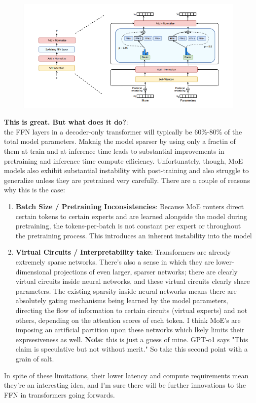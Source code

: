 \documentclass[12pt]{article}
\begin{document}
\begin{figure}[H]
    \centering
    \includegraphics[width=1.0\textwidth]{./moecircuit.png}
\end{figure}

\textbf{This is great. But what does it do?}:\\
the FFN layers in a decoder-only transformer will typically be 60\%-80\% of the total model parameters. Maknig the model sparser by using only a fractin of them at train and at inference time leads to substantial improvements in pretraining and inference time compute efficiency. Unfortunately, though, MoE models also exhibit substantial instability with post-training and also struggle to generalize unless they are pretrained very carefully. There are a couple of reasons why this is the case: 
\begin{enumerate}
\item \textbf{Batch Size / Pretraining Inconsistencies}: Because MoE routers direct certain tokens to certain experts and are learned alongside the model during pretraining, the tokens-per-batch is not constant per expert or throughout the pretraining process. This introduces an inherent instability into the model
\item \textbf{Virtual Circuits / Interpretability take}: Transformers are already extremely sparse networks. There's also a sense in which they are lower-dimensional projections of even larger, sparser networks; there are clearly virtual circuits inside neural networks, and these virtual circuits clearly share parameters. The existing sparsity inside neural networks means there are absolutely gating mechanisms being learned by the model parameters, directing the flow of information to certain circuits (virtual experts) and not others, depending on the attention scores of each token. I think MoE's are imposing an artificial partition upon these networks which lkely limits their exprsesiveness as well. \textbf{Note}: this is just a guess of mine. GPT-o1 says "This claim is speculative but not without merit." So take this second point with a grain of salt.
\end{enumerate}
In spite of these limitations, their lower latency and compute requirements mean they're an interesting idea, and I'm sure there will be further innovations to the FFN in transformers going forwards.
\end{document}
